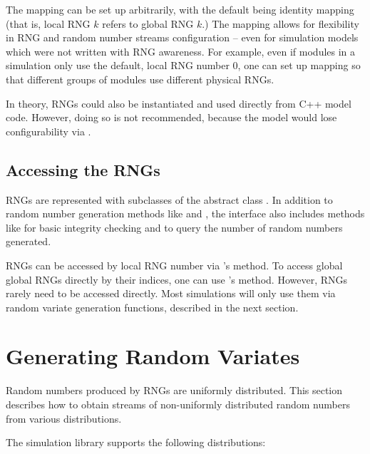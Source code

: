 The mapping can be set up arbitrarily, with the default being identity
mapping (that is, local RNG $k$ refers to global RNG $k$.) The mapping
allows for flexibility in RNG and random number streams configuration
-- even for simulation models which were not written with RNG awareness.
For example, even if modules in a simulation only use the default, local
RNG number 0, one can set up mapping so that different groups of modules
use different physical RNGs.

In theory, RNGs could also be instantiated and used directly from C++ model
code. However, doing so is not recommended, because the model would lose
configurability via .

\subsection{Accessing the RNGs}
\label{sec:sim-lib:accessing-rngs}

RNGs are represented with subclasses of the abstract class .
In addition to random number generation methods like  and
, the  interface also includes methods like
 for basic integrity checking and 
to query the number of random numbers generated.

RNGs can be accessed by local RNG number via 's
 method. To access global global RNGs directly by their
indices, one can use 's  method.
However, RNGs rarely need to be accessed directly. Most simulations will
only use them via random variate generation functions, described in the
next section.


\section{Generating Random Variates}
\label{sec:sim-lib:random-variate-generation}

Random numbers produced by RNGs are uniformly distributed. This section
describes how to obtain streams of non-uniformly distributed random numbers
from various distributions.

The simulation library supports the following distributions:

